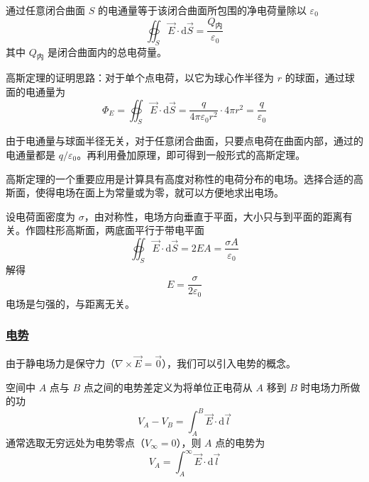\begin{theorem}[高斯定理]
    通过任意闭合曲面 $S$ 的电通量等于该闭合曲面所包围的净电荷量除以 $\varepsilon_0$
    \begin{equation}
        \oiint_S \vec{E} \cdot \mathrm{d}\vec{S} = \frac{Q_{\text{内}}}{\varepsilon_0}
    \end{equation}
    其中 $Q_{\text{内}}$ 是闭合曲面内的总电荷量。
\end{theorem}

高斯定理的证明思路：对于单个点电荷，以它为球心作半径为 $r$ 的球面，通过球面的电通量为
\begin{equation}
    \Phi_E = \oiint_S \vec{E} \cdot \mathrm{d}\vec{S} = \frac{q}{4\pi\varepsilon_0 r^2}\cdot 4\pi r^2 = \frac{q}{\varepsilon_0}
\end{equation}

由于电通量与球面半径无关，对于任意闭合曲面，只要点电荷在曲面内部，通过的电通量都是 $q/\varepsilon_0$。再利用叠加原理，即可得到一般形式的高斯定理。

高斯定理的一个重要应用是计算具有高度对称性的电荷分布的电场。选择合适的高斯面，使得电场在面上为常量或为零，就可以方便地求出电场。

\begin{example}[无限大均匀带电平面的电场]
    设电荷面密度为 $\sigma$，由对称性，电场方向垂直于平面，大小只与到平面的距离有关。作圆柱形高斯面，两底面平行于带电平面
    \begin{equation}
        \oiint_S \vec{E} \cdot \mathrm{d}\vec{S} = 2EA = \frac{\sigma A}{\varepsilon_0}
    \end{equation}
    解得
    \begin{equation}
        E = \frac{\sigma}{2\varepsilon_0}
    \end{equation}
    电场是匀强的，与距离无关。
\end{example}

\subsubsection{\protect\hyperlink{:}{电势}}

由于静电场力是保守力（$\nabla \times \vec{E} = \vec{0}$），我们可以引入电势的概念。

\begin{definition}[电势]
    空间中 $A$ 点与 $B$ 点之间的电势差定义为将单位正电荷从 $A$ 移到 $B$ 时电场力所做的功
    \begin{equation}
        V_A - V_B = \int_A^B \vec{E} \cdot \mathrm{d}\vec{l}
    \end{equation}
    通常选取无穷远处为电势零点（$V_\infty = 0$），则 $A$ 点的电势为
    \begin{equation}
        V_A = \int_A^\infty \vec{E} \cdot \mathrm{d}\vec{l}
    \end{equation}
\end{definition}


